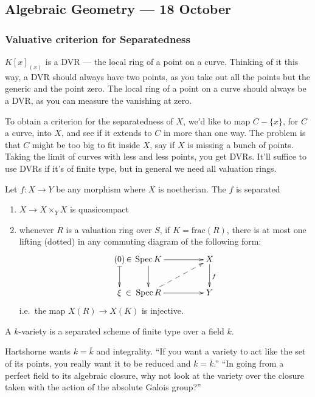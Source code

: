 \documentclass[11pt]{article}
\begin{document}
\begin{Oct18}
\section*{Algebraic Geometry --- 18 October}
\subsubsection*{Valuative criterion for Separatedness}
$K[x]_{(x)}$ is a DVR --- the local ring of a point on a curve. Thinking of it this way, a DVR should always have two points, as you take out all the points but the generic and the point zero. The local ring of a point on a curve should always be a DVR, as you can measure the vanishing at zero.

To obtain a criterion for the separatedness of $X$, we'd like to map $C-\{x\}$, for $C$ a curve, into $X$, and see if it extends to $C$ in more than one way. The problem is that $C$ might be too big to fit inside $X$, say if $X$ is missing a bunch of points. Taking the limit of curves with less and less points, you get DVRs. It'll suffice to use DVRs if it's of finite type, but in general we need all valuation rings.

\begin{thm*}
Let $f:X\to Y$ be
any morphism where $X$ is noetherian. The $f$ is separated \Iff
\begin{enumerate}\squishlist
\item $X\to X\times_Y X$ is quasicompact
\item whenever $R$ is a valuation ring over $S$, if $K=\text{frac}(R)$, there is at most one lifting (dotted) in any commuting
diagram of the following form:
\[\xymatrix@C=0cm{
(0)\,\makebox[-.05cm][l]{$\in$}\ar@{|->}[d]&&\Spec K\ar[rr]\ar[d]&
\qquad \qquad &X\ar[d]^f\\
\xi\,\makebox[-.05cm][l]{\,\,$\in$}&&\Spec R\ar[rr]\ar@{-->}[rru]&&Y
}\]
i.e.\ the map $X(R)\to X(K)$ is injective.
\end{enumerate}
\end{thm*}
\begin{defn*}
A $k$-variety is a separated scheme of finite type over a field $k$.
\end{defn*}
\noindent Hartshorne wants $k=\overline k$ and integrality. ``If you want a variety to act like the set of its points, you really want it to be reduced and $k=\overline k$.'' ``In going from a perfect field to its algebraic closure, why not look at the variety over the closure taken with the action of the absolute Galois group?''

\end{Oct18}
\end{document}
